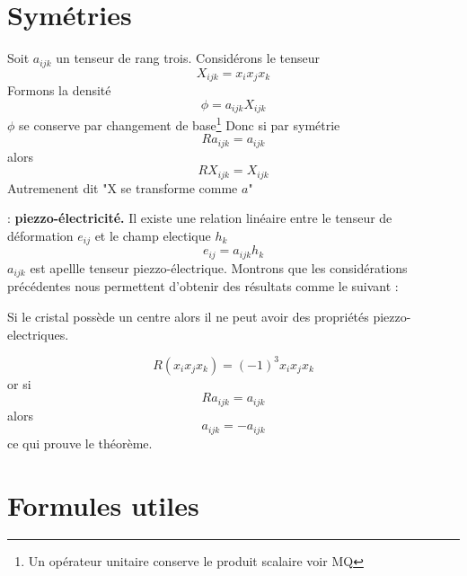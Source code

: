 \documentclass[12pt]{book}
\begin{document}
\section{Sym\'etries}
Soit $a_{ijk}$ un tenseur de rang trois. Consid\'erons le tenseur 
\begin{equation}
X_{ijk}=x_ix_jx_k
\end{equation}
Formons la densit\'e 
\begin{equation}
\phi=a_{ijk}X_{ijk}
\end{equation}
$\phi$ se conserve par changement de base\footnote{%
Un op\'erateur unitaire conserve le produit scalaire voir MQ}
Donc si par sym\'etrie 
\begin{equation}
Ra_{ijk}=a_{ijk}
\end{equation}
alors
\begin{equation}
RX_{ijk}=X_{ijk}
\end{equation}
Autremenent dit "X se transforme comme
$a$"\cite{ma:tense:Bass64,ma:tense:Brillouin38} 
\begin{exmp} : {\bf piezzo-\'electricit\'e.}
Il existe une relation lin\'eaire entre le tenseur de d\'eformation
$e_{ij}$ et le champ electique $h_k$
\begin{equation}
e_{ij}=a_{ijk}h_k
\end{equation}
$a_{ijk}$ est apellle tenseur piezzo-\'electrique.
Montrons que les consid\'erations pr\'ec\'edentes nous permettent d'obtenir des r\'esultats comme le suivant :
\begin{thm}
Si le cristal poss\`ede un centre alors il ne peut avoir des propri\'et\'es piezzo-electriques.
\end{thm}
\begin{pf}
\begin{equation}
R(x_ix_jx_k)=(-1)^3x_ix_jx_k
\end{equation}
or si 
\begin{equation}
Ra_{ijk}=a_{ijk}
\end{equation}
alors 
\begin{equation}
a_{ijk}=-a_{ijk}
\end{equation}
ce qui prouve le th\'eor\`eme.
\end{pf}
\end{exmp}
\section{Formules utiles}\label{secformultens}
\end{document}
